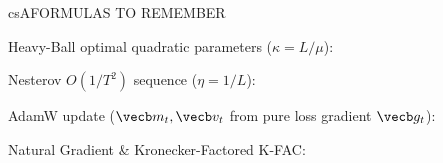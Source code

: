 \documentclass[../../../../master.tex]{subfiles}
\begin{document}
\csnextpage

\begin{cscolumns}
\begin{cscard}{csA}{FORMULAS TO REMEMBER}
  \begin{csbul}
    \item Heavy-Ball optimal quadratic parameters ($\kappa=L/\mu$):
    \item Nesterov $O(1/T^2)$ sequence ($\eta=1/L$):
    \item AdamW update ($\vecb m_t,\vecb v_t$ from pure loss gradient $\vecb g_t$):
    \item Natural Gradient \& Kronecker-Factored K-FAC:
  \end{csbul}
\end{cscard}


\end{cscolumns}
\end{document}
